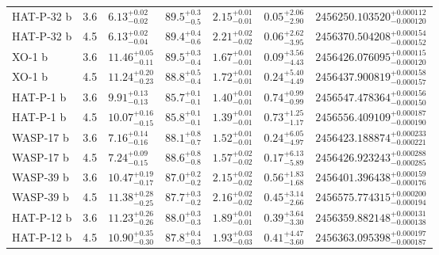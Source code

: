 {\begin{longtable}[h]{lllllll}
HAT-P-32 b   &               3.6 &   ${6.13}^{+0.02}_{-0.02}$ &  ${89.5}^{+0.3}_{-0.5}$ &  ${2.15}^{+0.01}_{-0.01}$ &    ${0.05}^{+2.06}_{-2.90}$ &  ${2456250.103520}^{+0.000112}_{-0.000120}$ \\
HAT-P-32 b   &               4.5 &   ${6.13}^{+0.02}_{-0.04}$ &  ${89.4}^{+0.4}_{-0.6}$ &  ${2.21}^{+0.02}_{-0.02}$ &    ${0.06}^{+2.62}_{-3.95}$ &  ${2456370.504208}^{+0.000154}_{-0.000152}$ \\
XO-1 b      &               3.6 &  ${11.46}^{+0.05}_{-0.11}$ &  ${89.5}^{+0.3}_{-0.4}$ &  ${1.67}^{+0.01}_{-0.01}$ &    ${0.09}^{+3.56}_{-4.43}$ &  ${2456426.076095}^{+0.000115}_{-0.000120}$ \\
XO-1 b      &               4.5 &  ${11.24}^{+0.20}_{-0.23}$ &  ${88.8}^{+0.5}_{-0.4}$ &  ${1.72}^{+0.01}_{-0.01}$ &    ${0.24}^{+5.40}_{-4.49}$ &  ${2456437.900819}^{+0.000158}_{-0.000157}$ \\
HAT-P-1 b    &               3.6 &   ${9.91}^{+0.13}_{-0.13}$ &  ${85.7}^{+0.1}_{-0.1}$ &  ${1.40}^{+0.01}_{-0.01}$ &    ${0.74}^{+0.99}_{-0.99}$ &  ${2456547.478364}^{+0.000156}_{-0.000150}$ \\
HAT-P-1 b    &               4.5 &  ${10.07}^{+0.16}_{-0.15}$ &  ${85.8}^{+0.1}_{-0.1}$ &  ${1.39}^{+0.01}_{-0.01}$ &    ${0.73}^{+1.25}_{-1.17}$ &  ${2456556.409109}^{+0.000187}_{-0.000190}$ \\
WASP-17 b   &               3.6 &   ${7.16}^{+0.14}_{-0.16}$ &  ${88.1}^{+0.8}_{-0.7}$ &  ${1.52}^{+0.01}_{-0.01}$ &    ${0.24}^{+6.05}_{-4.97}$ &  ${2456423.188874}^{+0.000233}_{-0.000221}$ \\
WASP-17 b   &               4.5 &   ${7.24}^{+0.09}_{-0.15}$ &  ${88.6}^{+0.8}_{-0.8}$ &  ${1.57}^{+0.02}_{-0.02}$ &    ${0.17}^{+6.13}_{-5.89}$ &  ${2456426.923243}^{+0.000288}_{-0.000285}$ \\
WASP-39 b   &               3.6 &  ${10.47}^{+0.19}_{-0.17}$ &  ${87.0}^{+0.2}_{-0.2}$ &  ${2.15}^{+0.02}_{-0.02}$ &    ${0.56}^{+1.83}_{-1.68}$ &  ${2456401.396438}^{+0.000159}_{-0.000176}$ \\
WASP-39 b   &               4.5 &  ${11.38}^{+0.28}_{-0.25}$ &  ${87.7}^{+0.3}_{-0.2}$ &  ${2.16}^{+0.02}_{-0.02}$ &    ${0.45}^{+3.14}_{-2.66}$ &  ${2456575.774315}^{+0.000200}_{-0.000194}$ \\
HAT-P-12 b   &               3.6 &  ${11.23}^{+0.26}_{-0.26}$ &  ${88.0}^{+0.3}_{-0.3}$ &  ${1.89}^{+0.01}_{-0.01}$ &    ${0.39}^{+3.64}_{-3.30}$ &  ${2456359.882148}^{+0.000131}_{-0.000138}$ \\
HAT-P-12 b   &               4.5 &  ${10.90}^{+0.35}_{-0.30}$ &  ${87.8}^{+0.4}_{-0.3}$ &  ${1.93}^{+0.03}_{-0.03}$ &    ${0.41}^{+4.47}_{-3.60}$ &  ${2456363.095398}^{+0.000197}_{-0.000187}$ \\

\end{longtable}}
